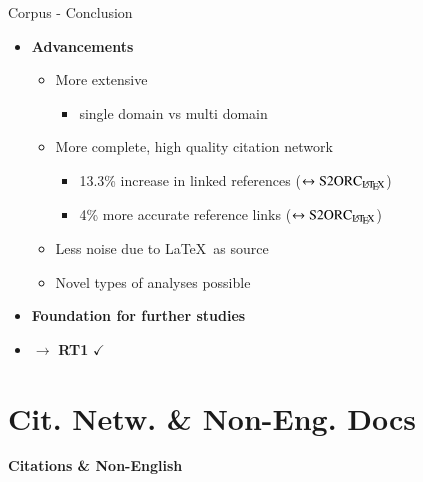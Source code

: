 \documentclass[en,16:9,smallfoot]{sdqbeamer}
\begin{document}
   \begin{frame}{Corpus - Conclusion}
        \begin{itemize}
        \item \textbf{Advancements}
            \begin{itemize}
                \item More extensive
                \begin{itemize}
                    \item single domain vs multi domain
                \end{itemize}
                \item More complete, high quality citation network
                \begin{itemize}
                    \item 13.3\% increase in linked references {\color{contextgrey}($\leftrightarrow \text{S2ORC}_\text{\LaTeX}$)}
                    \item 4\% more accurate reference links {\color{contextgrey}($\leftrightarrow \text{S2ORC}_\text{\LaTeX}$)}
                \end{itemize}
                \item Less noise due to \LaTeX\ as source
                \item Novel types of analyses possible
            \end{itemize}
        \item \textbf{Foundation for further studies}
        \item $\rightarrow$ \textbf{RT1} $\checkmark$
        \end{itemize}
   \end{frame}


\section{Cit. Netw. \& Non-Eng. Docs}

   \begin{frame}[plain]
        \vspace{0.7cm}
        \begin{infobox-map}
        \centering
        \begin{Huge}
        \textbf{Citations \& Non-English}\\
        \end{Huge}
        \end{infobox-map}
   \end{frame}
\end{document}

